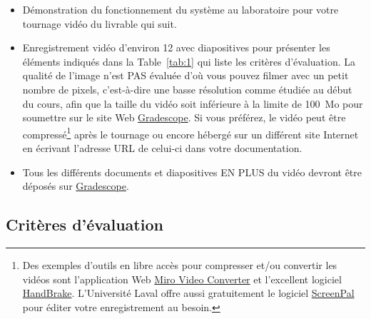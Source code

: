 \documentclass[english,french,12pt]{article}
\begin{document}
\begin{itemize}
\begin{itemize}[label=$\bullet$]
        \item photo haute résolution du circuit fait sur la plaquette de montage à partir des simulations et du plan de conception,
        \item liste et quantité de composants électroniques utilisés; elle est produite automatiquement avec le plan de design par la plupart des logiciels EDA,
        \item script de programmation bien structurée et commentée pour contrôler/communiquer avec la carte Arduino.
    \end{itemize}
    \item Démonstration du fonctionnement du système au laboratoire pour votre tournage vidéo du livrable qui suit.
    \item Enregistrement vidéo d'environ \SI{12}{\min} avec diapositives pour présenter les éléments indiqués dans la Table~\ref{tab:1} qui liste les critères d'évaluation. La qualité de l'image n'est PAS évaluée d'où vous pouvez filmer avec un petit nombre de pixels, c'est-à-dire une basse résolution comme étudiée au début du cours, afin que la taille du vidéo soit inférieure à la limite de \SI{100}{Mo} pour soumettre sur le site Web \href{https://www.gradescope.com/}{Gradescope}. Si vous préférez, le vidéo peut être compressé\footnote{Des exemples d'outils en libre accès pour compresser et/ou convertir les vidéos sont l'application Web \href{http://www.mirovideoconverter.com/}{Miro Video Converter} et l'excellent logiciel \href{https://handbrake.fr/downloads.php}{HandBrake}. L'Université Laval offre aussi gratuitement le logiciel \href{https://www.ene.ulaval.ca/captation-numerique/tous-les-utilisateurs-installer-la-version-deluxe-du-logiciel}{ScreenPal} pour éditer votre enregistrement au besoin.} après le tournage ou encore hébergé sur un différent site Internet en écrivant l'adresse URL de celui-ci dans votre documentation.
    \item Tous les différents documents et diapositives EN PLUS du vidéo devront être déposés sur \href{https://www.gradescope.com/}{Gradescope}.
\end{itemize}

\vspace{-2ex}
\subsection*{Critères d'évaluation}
\end{document}
